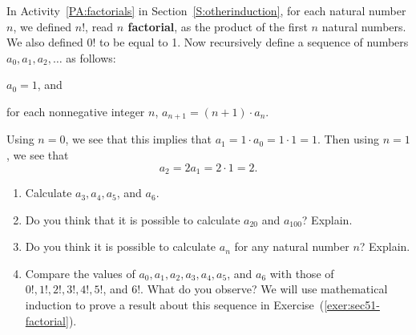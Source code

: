 \begin{previewactivity}
In \typeu Activity~\ref*{PA:factorials} in Section~\ref{S:otherinduction}, for each natural number $n$, we defined  $n!$, read  \textbf{$n$  factorial}, \label{factorial2}
%
 as the product of the first  $n$  natural numbers.  
We also defined  $0!$  to be equal to 1.  Now recursively define a sequence of numbers   $a_0 ,a_1 ,a_2 , \ldots $  as follows:
%
\begin{list}{}
\item $a_0  = 1$, and 
\item 
\item for each nonnegative integer  $n$,  $a_{n + 1}  = \left( {n + 1} \right) \cdot a_n $.
\end{list}
%
\vskip10pt
\noindent
Using $n=0$, we see that this implies that $a_1 =1 \cdot a_0 = 1 \cdot 1 = 1$\!.  Then using $n = 1$, we see that
\[
a_2 = 2 a_1 = 2 \cdot 1 = 2.
\]
\setcounter{oldenumi}{\theenumi}
\begin{enumerate} \setcounter{enumi}{\theoldenumi}
\item Calculate  $a_3, a_4, a_5$, and $a_6 $.

\item Do you think that it is possible to calculate  $a_{20} $ and  $a_{100} $\!?  Explain.

\item Do you think it is possible to calculate  $a_n $ for any natural number  $n$?  Explain.

\item Compare the values of  $a_0 ,a_1 ,a_2 ,a_3 ,a_4 ,a_5$, and $a_6 $ with those of  \\$0!,1!,2!,3!,4!,5!$, and $6!$.  What do you observe?  We will use mathematical induction to prove a result about this sequence in 
Exercise~(\ref{exer:sec51-factorial}).
\end{enumerate}

\end{previewactivity}
\hbreak

\endinput
